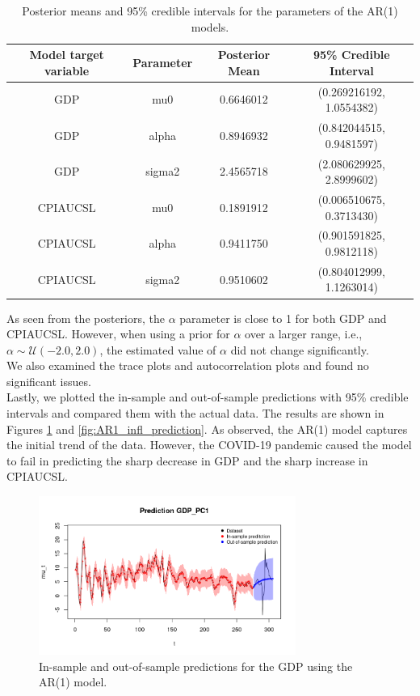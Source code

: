 \begin{table}[H]
    \centering
    \begin{tabular}{|c|c|c|c|}
        \hline
        \textbf{Model target variable } & \textbf{Parameter } & \textbf{Posterior Mean } & \textbf{95\% Credible Interval } \\
        \hline
        GDP      & mu0    & 0.6646012 & (0.269216192, 1.0554382) \\
        GDP      & alpha  & 0.8946932 & (0.842044515, 0.9481597) \\
        GDP      & sigma2 & 2.4565718 & (2.080629925, 2.8999602) \\
        CPIAUCSL & mu0    & 0.1891912 & (0.006510675, 0.3713430) \\
        CPIAUCSL & alpha  & 0.9411750 & (0.901591825, 0.9812118) \\
        CPIAUCSL & sigma2 & 0.9510602 & (0.804012999, 1.1263014) \\
        \hline
    \end{tabular}
    \caption{Posterior means and 95\% credible intervals for the parameters of the AR(1) models.}
    \label{tab:AR1_posteriors}
\end{table}
As seen from the posteriors, the $\alpha$ parameter is close to 1 for both GDP and CPIAUCSL. However, when using a prior for $\alpha$ over a larger range, i.e., $\alpha \sim \mathcal{U}(-2.0, 2.0)$, the estimated value of $\alpha$ did not change significantly. \\
We also examined the trace plots and autocorrelation plots and found no significant issues. \\
Lastly, we plotted the in-sample and out-of-sample predictions with 95\% credible intervals and compared them with the actual data. The results are shown in Figures \ref{fig:AR1_gdp_prediction} and \ref{fig:AR1_infl_prediction}. As observed, the AR(1) model captures the initial trend of the data. However, the COVID-19 pandemic caused the model to fail in predicting the sharp decrease in GDP and the sharp increase in CPIAUCSL. \\
\begin{figure}[H]
    \centering
    \includegraphics[width=0.75\textwidth]{images/2-AR/gdp_prediction.png}
    \caption{In-sample and out-of-sample predictions for the GDP using the AR(1) model.}
    \label{fig:AR1_gdp_prediction}
\end{figure}
